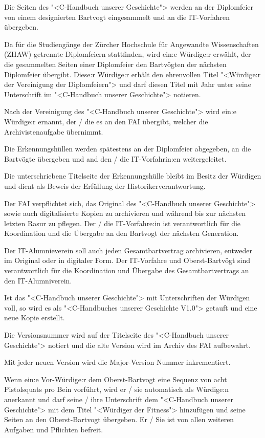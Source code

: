 \documentclass[fontsize=12pt,parskip=half]{scrartcl}
\begin{document}
\begin{contract}
  \Clause[title={Einsammlung}]\label{H.einsammlung}
  Die Seiten des "<C-Handbuch unserer Geschichte"> werden an der Diplomfeier von einem designierten Bartvogt eingesammelt und an die IT-Vorfahren übergeben.

  Da für die Studiengänge der Zürcher Hochschule für Angewandte Wissenschaften (ZHAW) getrennte Diplomfeiern stattfinden, wird ein:e Würdige:r erwählt, der die gesammelten
  Seiten einer Diplomfeier den Bartvögten der nächsten Diplomfeier übergibt. Diese:r Würdige:r erhält den ehrenvollen Titel "<Würdige:r der Vereinigung der Diplomfeiern"> und darf
  diesen Titel mit Jahr unter seine Unterschrift im "<C-Handbuch unserer Geschichte"> notieren.

  Nach der Vereinigung des "<C-Handbuch unserer Geschichte"> wird ein:e Würdige:r ernannt, der / die es an den FAI übergibt, welcher die Archivistenaufgabe  übernimmt.

  Die Erkennungshüllen werden spätestens an der Diplomfeier abgegeben, an die Bartvögte übergeben und and den / die IT-Vorfahrin:en weitergeleitet.

  Die unterschriebene Titelseite der Erkennungshülle bleibt im Besitz der Würdigen und dient als Beweis der Erfüllung der Historikerverantwortung.

  \Clause[title={Archivistenaufgabe}]\label{H.archivistenaufgabe}
  Der FAI verpflichtet sich, das Original des "<C-Handbuch unserer Geschichte"> sowie auch digitalisierte Kopien zu archivieren und während bis zur nächsten letzten Rasur
  zu pflegen. Der / die IT-Vorfahre:in ist verantwortlich für die Koordination und die Übergabe an den Bartvogt der nächsten Generation.

  Der IT-Alumnieverein soll auch jeden Gesamtbartvertrag archivieren, entweder im Original oder in digitaler Form. Der IT-Vorfahre und Oberst-Bartvögt sind verantwortlich für die Koordination
  und Übergabe des Gesamtbartvertrags an den IT-Alumniverein.

  Ist das "<C-Handbuch unserer Geschichte"> mit Unterschriften der Würdigen voll, so wird es als "<C-Handbuches unserer Geschichte V1.0"> getauft und eine neue Kopie erstellt.

  Die Versionsnummer wird auf der Titelseite des "<C-Handbuch unserer Geschichte"> notiert und die alte Version wird im Archiv des FAI aufbewahrt.

  Mit jeder neuen Version wird die Major-Version Nummer inkrementiert.

  \Clause[title={Fittnessklausel}]
  Wenn ein:e Vor-Würdige:r dem Oberst-Bartvogt eine Sequenz von acht Pistolsquats pro Bein vorführt, wird er / sie automatisch als Würdige:n anerkannt und darf seine / ihre Unterschrift
  dem "<C-Handbuch unserer Geschichte"> mit dem Titel "<Würdiger der Fitness"> hinzufügen und seine Seiten an den Oberst-Bartvogt übergeben. Er / Sie ist von allen weiteren
  Aufgaben und Pflichten befreit.

\end{contract}
\end{document}
